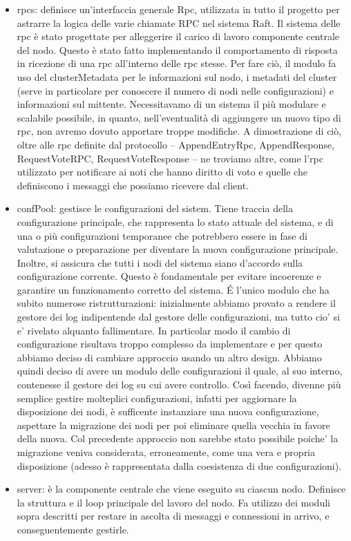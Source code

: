 \begin{itemize}
  \item rpcs: definisce un'interfaccia generale Rpc, utilizzata in tutto il progetto per astrarre la logica delle varie chiamate RPC nel sistema Raft. Il sistema delle rpc è stato progettate per alleggerire il carico di lavoro
    componente centrale del nodo. Questo è stato fatto implementando il comportamento di risposta in ricezione di una rpc all'interno delle rpc stesse. Per fare ciò, il modulo fa uso del clusterMetadata 
    per le informazioni sul nodo, i metadati del cluster (serve in particolare per conoscere il numero di nodi nelle configurazioni) e informazioni sul mittente. Necessitavamo di un sistema il più modulare e scalabile possibile, in quanto,
    nell'eventualità di aggiungere un nuovo tipo di rpc, non avremo dovuto apportare troppe modifiche. A dimostrazione di ciò, oltre alle rpc definite dal protocollo -- AppendEntryRpc, AppendResponse, RequestVoteRPC, 
    RequestVoteResponse -- ne troviamo altre, come l'rpc utilizzato per notificare ai noti che hanno diritto di voto e quelle che definiscono i messaggi che possiamo ricevere dal client. 
    
  \item confPool: gestisce le configurazioni del sistem. Tiene traccia della configurazione principale, che rappresenta lo stato attuale del sistema, e di una o più configurazioni temporanee che potrebbero essere in fase di 
    valutazione o preparazione per diventare la nuova configurazione principale. Inoltre, si assicura che tutti i nodi del sistema siano d'accordo sulla configurazione corrente. Questo è fondamentale per evitare 
    incoerenze e garantire un funzionamento corretto del sistema. \'E l'unico modulo che ha subito numerose ristrutturazioni: inizialmente abbiamo provato a rendere il gestore dei log indipentende dal gestore delle configurazioni, 
    ma tutto cio' si e' rivelato alquanto fallimentare. In particolar modo il cambio di configurazione risultava troppo complesso da implementare e per questo abbiamo deciso di cambiare approccio usando un altro design. Abbiamo 
    quindi deciso di avere un modulo delle configurazioni il quale, al suo interno, contenesse il gestore dei log su cui avere controllo. Così facendo, divenne più semplice gestire molteplici configurazioni, infatti per aggiornare
    la disposizione dei nodi, è sufficente instanziare una nuova configurazione, aspettare la migrazione dei nodi per poi eliminare quella vecchia in favore della nuova. 
    Col precedente approccio non sarebbe stato possibile poiche' la migrazione veniva 
    considerata, erroneamente, come una vera e propria disposizione (adesso è rappresentata dalla coesistenza di due configurazioni). 
  
  \item server: è la componente centrale che viene eseguito su ciascun nodo. Definisce la struttura e il loop principale del lavoro del nodo. Fa utilizzo dei moduli sopra descritti per restare in ascolta di messaggi e connessioni 
    in arrivo, e conseguentemente gestirle.

\end{itemize}


